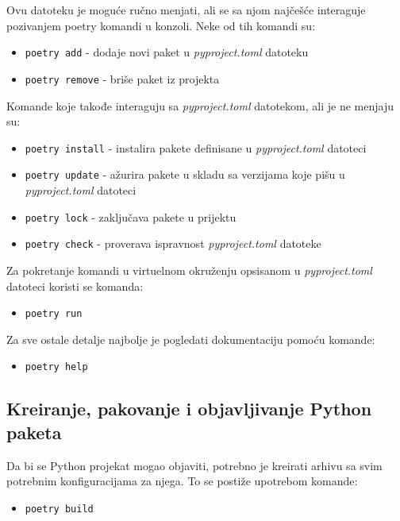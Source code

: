 \documentclass[12pt]{report}
\begin{document}
Ovu datoteku je moguće ručno menjati, ali se sa njom najčešće interaguje pozivanjem poetry komandi u konzoli. Neke od tih komandi su:

\begin{itemize}
    \item \texttt{poetry add} - dodaje novi paket u \textit{pyproject.toml} datoteku
    \item \texttt{poetry remove} - briše paket iz projekta
\end{itemize}

Komande koje takođe interaguju sa \textit{pyproject.toml} datotekom, ali je ne menjaju su:

\begin{itemize}
    \item \texttt{poetry install} - instalira pakete definisane u \textit{pyproject.toml} datoteci
    \item \texttt{poetry update} - ažurira pakete u skladu sa verzijama koje pišu u \textit{pyproject.toml} datoteci
    \item \texttt{poetry lock} - zaključava pakete u prijektu
    \item \texttt{poetry check} - proverava ispravnost \textit{pyproject.toml} datoteke
\end{itemize}

Za pokretanje komandi u virtuelnom okruženju opsisanom u \textit{pyproject.toml} datoteci koristi se komanda:

\begin{itemize}
    \item \texttt{poetry run}
\end{itemize}

Za sve ostale detalje najbolje je pogledati dokumentaciju pomoću komande:

\begin{itemize}
    \item \texttt{poetry help}
\end{itemize}

\subsection{Kreiranje, pakovanje i objavljivanje Python paketa}
Da bi se Python projekat mogao objaviti, potrebno je kreirati arhivu sa svim potrebnim konfiguracijama za njega. To se postiže upotrebom komande:

\begin{itemize}
    \item \texttt{poetry build}
\end{itemize}
\end{document}
